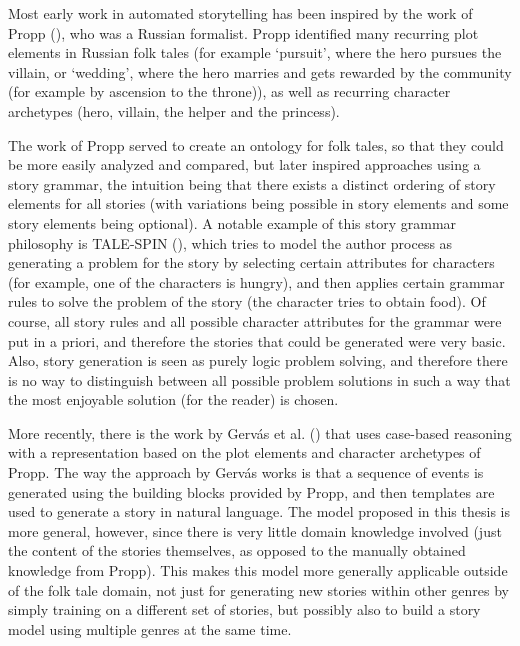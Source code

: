 Most early work in automated storytelling has been inspired by the work of Propp
(\cite{propp1968morphology}), who was a Russian formalist. Propp identified many recurring plot elements in
Russian folk tales (for example `pursuit', where the hero pursues the villain, or
`wedding', where the hero marries and gets rewarded by the community (for example
by ascension to the throne)), as well as recurring character archetypes (hero, villain,
the helper and the princess).

The work of Propp served to create an ontology for folk tales,
so that they could be more easily analyzed and compared, but later inspired
approaches using a story grammar, the intuition being that there exists a distinct
ordering of story elements for all stories (with variations being possible in
story elements and some story elements being optional). A
notable example of this story grammar philosophy is TALE-SPIN
(\cite{meehan1977tale}), which tries to model the author process as generating
a problem for the story by selecting certain attributes for characters (for example, one of the characters is hungry), and then
applies certain grammar rules to solve the problem of the story (the character
tries to obtain food).
Of course, all story rules and all possible character attributes for the grammar were put in
a priori, and therefore the stories that could be generated were very basic. Also,
story generation is seen as purely logic problem solving, and therefore there
is no way to distinguish between all possible problem solutions in such a way that the
most enjoyable solution (for the reader) is chosen.

More recently, there
is the work by Gerv\'as et al. (\cite{Gervas2005235}) that uses case-based
reasoning with a representation based on the plot elements and character
archetypes of Propp.
The way the approach by Gerv\'as works is that a sequence of events is generated using the
building blocks provided by Propp, and then templates are used to generate a
story in natural language.
The model proposed in this thesis is more general, however, since there is very
little domain knowledge involved (just the content of the stories themselves, as
opposed to the manually obtained knowledge from Propp).
This makes this model more generally applicable outside of the folk tale domain,
not just for generating new stories within other genres by simply training on a
different set of stories, but possibly also to
build a story model using multiple genres at the same time.

